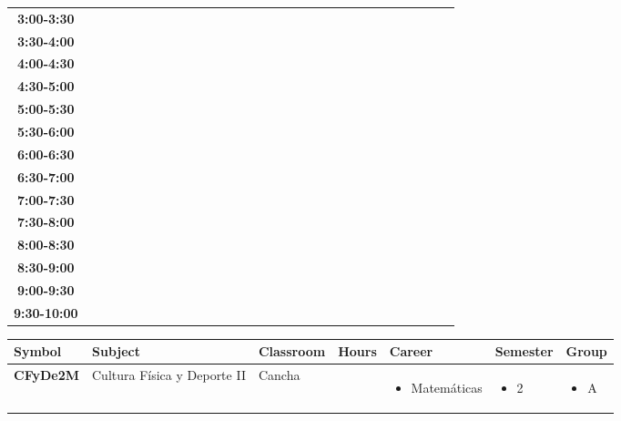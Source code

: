 \documentclass{article}
\begin{document}
\begin{table}[ht]
\begin{tabular}{|c|c|c|c|c|c|c|c|c|c|c|c|c|c|c|c|c|c|c|c|c|c|c|c|c|c|c|c|c|c|}
 \cline{1-8} 
\textbf{3:00-3:30} &   &   &   &   &   &   &   \\
 \cline{1-8} 
\textbf{3:30-4:00} &   &   &   &   &   &   &   \\
 \cline{1-8} 
\textbf{4:00-4:30} &   &   &   &   &   &   &   \\
 \cline{1-8} 
\textbf{4:30-5:00} &   &   &   &   &   &   &   \\
 \cline{1-8} 
\textbf{5:00-5:30} &   &   &   &   &   &   &   \\
 \cline{1-8} 
\textbf{5:30-6:00} &   &   &   &   &   &   &   \\
 \cline{1-8} 
\textbf{6:00-6:30} &   &   &   &   &   &   &   \\
 \cline{1-8} 
\textbf{6:30-7:00} &   &   &   &   &   &   &   \\
 \cline{1-8} 
\textbf{7:00-7:30} &   &   &   &   &   &   &   \\
 \cline{1-8} 
\textbf{7:30-8:00} &   &   &   &   &   &   &   \\
 \cline{1-8} 
\textbf{8:00-8:30} &   &   &   &   &   &   &   \\
 \cline{1-8} 
\textbf{8:30-9:00} &   &   &   &   &   &   &   \\
 \cline{1-8} 
\textbf{9:00-9:30} &   &   &   &   &   &   &   \\
 \cline{1-8} 
\textbf{9:30-10:00} &   &   &   &   &   &   &   \\
 \cline{1-8} 
\end{tabular}\end{table}

        
        \begin{tabular}{|>{\centering\arraybackslash}m{2cm}|>{\centering\arraybackslash}m{4cm}|>{\centering\arraybackslash}m{2cm}|>{\centering\arraybackslash}m{2cm}|>{\centering\arraybackslash}m{2cm}|>{\centering\arraybackslash}m{2cm}|>{\centering\arraybackslash}m{2cm}|}
        \hline
        \textbf{Symbol} & \textbf{Subject} & \textbf{Classroom} & \textbf{Hours} & \textbf{Career} & \textbf{Semester} & \textbf{Group} \\
        \hline
        
            \hline
            \cellcolor[rgb]{0.24313725490196078,0.47058823529411764,0.11372549019607843} \textbf{CFyDe2M} & Cultura F\'isica y Deporte II & Cancha & 2.0 & \begin{itemize}[left=0pt,align=left]\item Matem\'aticas 
\end{itemize} & \begin{itemize}[left=0pt,align=left]\item 2 
\end{itemize} & \begin{itemize}[left=0pt,align=left]\item A 
\end{itemize}  \\
            \hline
            \end{tabular}
                    
\end{document}
